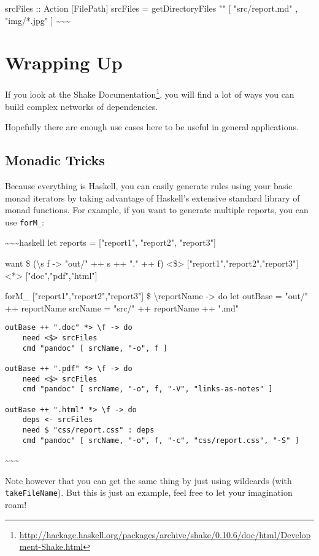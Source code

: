 \documentclass[]{article}
\renewcommand{\href}[2]{#2\footnote{\url{#1}}}
\begin{document}
srcFiles :: Action {[}FilePath{]} srcFiles = getDirectoryFiles "" {[}
"src/report.md" , "img/*.jpg" {]}
\textasciitilde{}\textasciitilde{}\textasciitilde{}

\section{Wrapping Up}

If you look at the
\href{http://hackage.haskell.org/packages/archive/shake/0.10.6/doc/html/Development-Shake.html}{Shake
Documentation}, you will find a lot of ways you can build complex networks of
dependencies.

Hopefully there are enough use cases here to be useful in general applications.

\subsection{Monadic Tricks}

Because everything is Haskell, you can easily generate rules using your basic
monad iterators by taking advantage of Haskell's extensive standard library of
monad functions. For example, if you want to generate multiple reports, you can
use \texttt{forM\_}:

\textasciitilde{}\textasciitilde{}\textasciitilde{}haskell let reports =
{[}"report1", "report2", "report3"{]}

want \$ (\textbackslash{}s f -\textgreater{} "out/" ++ s ++ "." ++ f)
\textless{}\$\textgreater{} {[}"report1","report2","report3"{]}
\textless{}*\textgreater{} {[}"doc","pdf","html"{]}

forM\_ {[}"report1","report2","report3"{]} \$ \textbackslash{}reportName
-\textgreater{} do let outBase = "out/" ++ reportName srcName = "src/" ++
reportName ++ ".md"

\begin{verbatim}
outBase ++ ".doc" *> \f -> do
    need <$> srcFiles
    cmd "pandoc" [ srcName, "-o", f ]

outBase ++ ".pdf" *> \f -> do
    need <$> srcFiles
    cmd "pandoc" [ srcName, "-o", f, "-V", "links-as-notes" ]

outBase ++ ".html" *> \f -> do
    deps <- srcFiles
    need $ "css/report.css" : deps
    cmd "pandoc" [ srcName, "-o", f, "-c", "css/report.css", "-S" ]
\end{verbatim}

\textasciitilde{}\textasciitilde{}\textasciitilde{}

Note however that you can get the same thing by just using wildcards (with
\texttt{takeFileName}). But this is just an example, feel free to let your
imagination roam!
\end{document}
